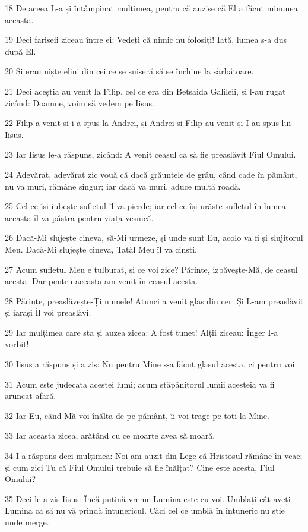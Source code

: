 \par 18 De aceea L-a și întâmpinat mulțimea, pentru că auzise că El a făcut minunea aceasta.
\par 19 Deci fariseii ziceau între ei: Vedeți că nimic nu folosiți! Iată, lumea s-a dus după El.
\par 20 Și erau niște elini din cei ce se suiseră să se închine la sărbătoare.
\par 21 Deci aceștia au venit la Filip, cel ce era din Betsaida Galileii, și l-au rugat zicând: Doamne, voim să vedem pe Iisus.
\par 22 Filip a venit și i-a spus la Andrei, și Andrei și Filip au venit și I-au spus lui Iisus.
\par 23 Iar Iisus le-a răspuns, zicând: A venit ceasul ca să fie preaslăvit Fiul Omului.
\par 24 Adevărat, adevărat zic vouă că dacă grăuntele de grâu, când cade în pământ, nu va muri, rămâne singur; iar dacă va muri, aduce multă roadă.
\par 25 Cel ce își iubește sufletul îl va pierde; iar cel ce își urăște sufletul în lumea aceasta îl va păstra pentru viața veșnică.
\par 26 Dacă-Mi slujește cineva, să-Mi urmeze, și unde sunt Eu, acolo va fi și slujitorul Meu. Dacă-Mi slujește cineva, Tatăl Meu îl va cinsti.
\par 27 Acum sufletul Meu e tulburat, și ce voi zice? Părinte, izbăvește-Mă, de ceasul acesta. Dar pentru aceasta am venit în ceasul acesta.
\par 28 Părinte, preaslăvește-Ți numele! Atunci a venit glas din cer: Și L-am preaslăvit și iarăși Îl voi preaslăvi.
\par 29 Iar mulțimea care sta și auzea zicea: A fost tunet! Alții ziceau: Înger I-a vorbit!
\par 30 Iisus a răspuns și a zis: Nu pentru Mine s-a făcut glasul acesta, ci pentru voi.
\par 31 Acum este judecata acestei lumi; acum stăpânitorul lumii acesteia va fi aruncat afară.
\par 32 Iar Eu, când Mă voi înălța de pe pământ, îi voi trage pe toți la Mine.
\par 33 Iar aceasta zicea, arătând cu ce moarte avea să moară.
\par 34 I-a răspuns deci mulțimea: Noi am auzit din Lege că Hristosul rămâne în veac; și cum zici Tu că Fiul Omului trebuie să fie înălțat? Cine este acesta, Fiul Omului?
\par 35 Deci le-a zis Iisus: Încă puțină vreme Lumina este cu voi. Umblați cât aveți Lumina ca să nu vă prindă întunericul. Căci cel ce umblă în întuneric nu știe unde merge.
